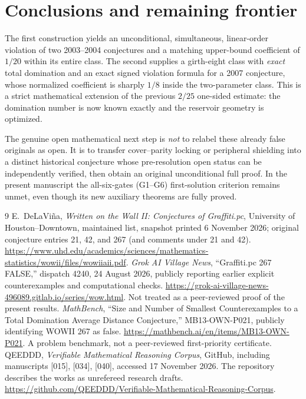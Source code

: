\documentclass[11pt,a4paper]{article}
\theoremstyle{definition}
\theoremstyle{remark}
\begin{document}
\section{Conclusions and remaining frontier}
The first construction yields an unconditional, simultaneous, linear-order violation of two 2003--2004 conjectures and a matching upper-bound coefficient of $1/20$ within its entire class. The second supplies a girth-eight class with \emph{exact} total domination and an exact signed violation formula for a 2007 conjecture, whose normalized coefficient is sharply $1/8$ inside the two-parameter class. This is a strict mathematical extension of the previous $2/25$ one-sided estimate: the domination number is now known exactly and the reservoir geometry is optimized.

The genuine open mathematical next step is \emph{not} to relabel these already false originals as open. It is to transfer cover--parity locking or peripheral shielding into a distinct historical conjecture whose pre-resolution open status can be independently verified, then obtain an original unconditional full proof. In the present manuscript the all-six-gates (G1--G6) first-solution criterion remains unmet, even though its new auxiliary theorems are fully proved.

\begin{thebibliography}{9}
 E.~DeLaVi\~na, \emph{Written on the Wall II: Conjectures of Graffiti.pc}, University of Houston--Downtown, maintained list, snapshot printed 6 November 2026; original conjecture entries 21, 42, and 267 (and comments under 21 and 42). \url{https://www.uhd.edu/academics/sciences/mathematics-statistics/wowii/files/wowiiaii.pdf}.
 \emph{Grok AI Village News}, ``Graffiti.pc 267 FALSE,'' dispatch 4240, 24 August 2026, publicly reporting earlier explicit counterexamples and computational checks. \url{https://grok-ai-village-news-496089.gitlab.io/series/wow.html}. Not treated as a peer-reviewed proof of the present results.
 \emph{MathBench}, ``Size and Number of Smallest Counterexamples to a Total Domination Average Distance Conjecture,'' MB13-OWN-P021, publicly identifying WOWII 267 as false. \url{https://mathbench.ai/en/items/MB13-OWN-P021}. A problem benchmark, not a peer-reviewed first-priority certificate.
 QEEDDD, \emph{Verifiable Mathematical Reasoning Corpus}, GitHub, including manuscripts [015], [034], [040], accessed 17 November 2026. The repository describes the works as unrefereed research drafts. \url{https://github.com/QEEDDD/Verifiable-Mathematical-Reasoning-Corpus}.
\end{thebibliography}
\end{document}
